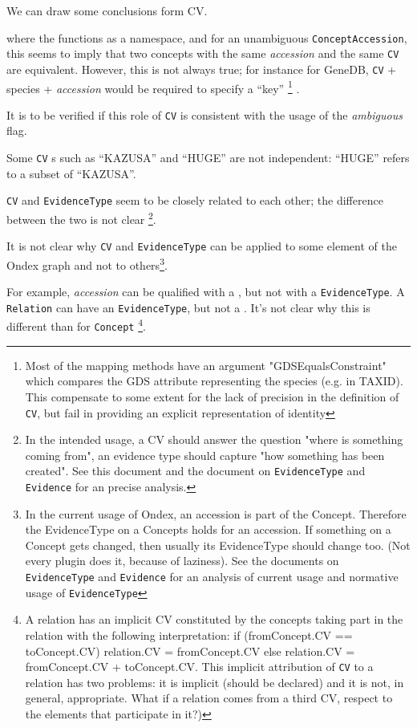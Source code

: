 \documentclass[a4paper,10pt]{article}
\newcommand{\field}[1]{\textit{#1}\xspace}
\newcommand{\term}[1]{\texttt{#1}\xspace}
\begin{document}
We can draw some conclusions form CV. 

\vskip 0.5cm
where the \cv
functions as a namespace, and for an unambiguous \term{ConceptAccession}, this
seems to imply that two concepts with the same \field{accession} and the same
\term{CV} are equivalent. However, this is not always true; for instance for
GeneDB, \term{CV} + species + \field{accession} would be required to specify a
``key''
\footnote{Most of the mapping methods have an argument "GDSEqualsConstraint" which compares the GDS attribute representing the species (e.g. in TAXID). This compensate to some extent for the lack of precision in the definition of \term{CV}, but fail in providing an explicit representation of identity } .


It is to be verified if this role of \term{CV} is consistent with the usage of the
\field{ambiguous} flag.
\vskip 0.5cm

Some \term{CV}s such as ``KAZUSA'' and ``HUGE'' are not independent: ``HUGE''
refers to a subset of ``KAZUSA''. 
\vskip 0.5cm

\newcommand{\relation}{\term{relation}} \term{CV} and \term{EvidenceType} seem
to be closely related to each other; the difference between the two is not
clear
\footnote{
In the intended usage, a CV should answer the question "where is something coming from", an evidence type should capture "how something has been created". See this document and the document on  \term{EvidenceType} and \term{Evidence} for an precise analysis.
}.
\vskip 0.5cm

It is not clear why \term{CV} and \term{EvidenceType} can be applied to some element of the Ondex graph and not to others\footnote{
In the current usage of Ondex, an accession is part of the Concept. Therefore the EvidenceType on a Concepts holds for an accession. If something on a Concept gets changed, then usually its EvidenceType should change too. (Not every plugin does it, because of laziness). See the documents on \term{EvidenceType} and \term{Evidence} for an analysis of current usage and normative usage of \term{EvidenceType}
 }.

For example, \field{accession} can be qualified with a \cv, but not with a \term{EvidenceType}.
A \term{Relation} can have an \term{EvidenceType}, but not a \cv. It's not clear why this is different than for \term{Concept} \footnote{A relation has an implicit CV constituted by the concepts taking part in the relation with the following interpretation: if (fromConcept.CV == toConcept.CV) relation.CV = fromConcept.CV
else
relation.CV = fromConcept.CV + toConcept.CV. This implicit attribution of \term{CV} to a relation has two problems: it is implicit (should be declared) and it is not, in general, appropriate. What if a relation comes from a third CV, respect to the elements that participate in it?)
}. 
\end{document}
